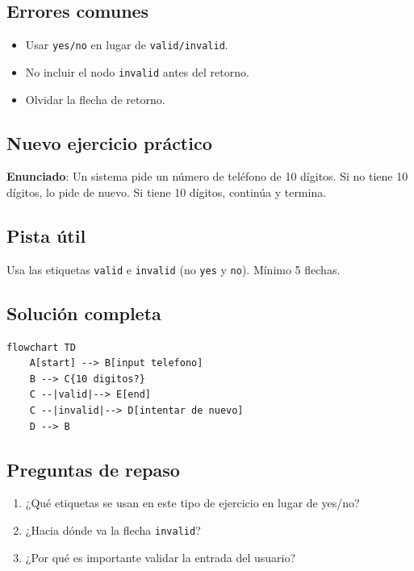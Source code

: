\documentclass[12pt]{article}
\begin{document}
\subsection{Errores comunes}

\begin{itemize}
    \item Usar \texttt{yes/no} en lugar de \texttt{valid/invalid}.
    \item No incluir el nodo \texttt{invalid} antes del retorno.
    \item Olvidar la flecha de retorno.
\end{itemize}

\subsection{Nuevo ejercicio práctico}

\textbf{Enunciado}: Un sistema pide un número de teléfono de 10 dígitos. Si no tiene 10 dígitos, lo pide de nuevo. Si tiene 10 dígitos, continúa y termina.

\subsection{Pista útil}

Usa las etiquetas \texttt{valid} e \texttt{invalid} (no \texttt{yes} y \texttt{no}). Mínimo 5 flechas.

\subsection{Solución completa}

\begin{lstlisting}[style=mermaidstyle]
flowchart TD
    A[start] --> B[input telefono]
    B --> C{10 digitos?}
    C --|valid|--> E[end]
    C --|invalid|--> D[intentar de nuevo]
    D --> B
\end{lstlisting}

\subsection{Preguntas de repaso}

\begin{enumerate}
    \item ¿Qué etiquetas se usan en este tipo de ejercicio en lugar de yes/no?
    \item ¿Hacia dónde va la flecha \texttt{invalid}?
    \item ¿Por qué es importante validar la entrada del usuario?
\end{enumerate}
\end{document}
